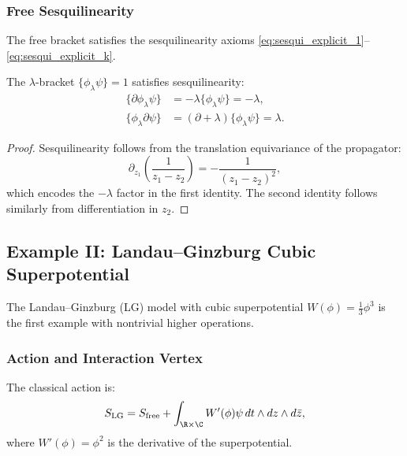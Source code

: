 \subsubsection{Free Sesquilinearity}

The free bracket satisfies the sesquilinearity axioms
\eqref{eq:sesqui_explicit_1}--\eqref{eq:sesqui_explicit_k}.
\begin{lemma}
The $\lambda$-bracket $\{\phi_\lambda \psi\} = 1$ satisfies sesquilinearity:
\begin{align}
\{\partial \phi_\lambda \psi\} &= -\lambda \{\phi_\lambda \psi\} = -\lambda, \\
\{\phi_\lambda \partial \psi\} &= (\partial + \lambda) \{\phi_\lambda \psi\} = \lambda.
\end{align}
\end{lemma}

\begin{proof}
Sesquilinearity follows from the translation equivariance of the propagator:
\begin{equation}
\partial_{z_1} \left( \frac{1}{z_1 - z_2} \right) = -\frac{1}{(z_1 - z_2)^2},
\end{equation}
which encodes the $-\lambda$ factor in the first identity. The second identity follows similarly from differentiation in $z_2$.
\end{proof}

\subsection{Example II: Landau--Ginzburg Cubic Superpotential}

The Landau--Ginzburg (LG) model with cubic superpotential $W(\phi) = \frac{1}{3} \phi^3$ is the first example with nontrivial higher operations.

\subsubsection{Action and Interaction Vertex}

The classical action is:
\begin{equation}
S_{\text{LG}} = S_{\text{free}} + \int_{\R \times \C} W'(\phi) \psi \, dt \wedge dz \wedge d\bar{z},
\end{equation}
where $W'(\phi) = \phi^2$ is the derivative of the superpotential.

